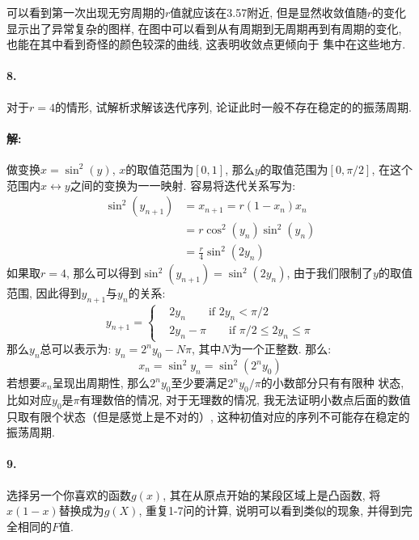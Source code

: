 \documentclass[a4paper,zihao=5,UTF8]{ctexart}
\begin{document}
    可以看到第一次出现无穷周期的$r$值就应该在3.57附近, 但是显然收敛值随$r$的变化显示出了异常复杂的图样, 
    在图中可以看到从有周期到无周期再到有周期的变化, 也能在其中看到奇怪的颜色较深的曲线, 这表明收敛点更倾向于
    集中在这些地方.

    \paragraph{8.}
    对于$r=4$的情形, 试解析求解该迭代序列, 论证此时一般不存在稳定的的振荡周期.
    \paragraph{解: }
    做变换$x = \sin^2(y)$, $x$的取值范围为$[0, 1]$, 那么$y$的取值范围为$[0, \pi/2]$, 在这个
    范围内$x\leftrightarrow y$之间的变换为一一映射. 容易将迭代关系写为:
    \begin{equation}
        \begin{split}
            \sin^2(y_{n+1}) &= x_{n+1} = r(1 - x_n)x_n\\
            & = r\cos^2(y_n)\sin^2(y_n)\\
            & = \frac{r}{4}\sin^2(2y_n)
        \end{split}
    \end{equation}
    如果取$r = 4$, 那么可以得到$\sin^2(y_{n+1}) = \sin^2(2y_n)$, 由于我们限制了$y$的取值范围, 
    因此得到$y_{n+1}$与$y_n$的关系:
    \begin{equation}
        y_{n+1} = 
        \left\{
        \begin{aligned}
            &2y_n\quad\quad \text{if}\,\, 2y_n < \pi/2\\
            &2y_n - \pi \quad\quad \text{if}\,\,\pi / 2 \leq 2y_n \leq \pi 
        \end{aligned}
        \right.
    \end{equation}
    那么$y_n$总可以表示为: $y_n = 2^n y_0 - N\pi$, 其中$N$为一个正整数. 
    那么:
    \begin{equation}
        x_n = \sin^2{y_n} = \sin^2(2^ny_0)
    \end{equation}
    若想要$x_n$呈现出周期性, 那么$2^ny_0$至少要满足$2^ny_0 / \pi$的小数部分只有有限种
    状态, 比如对应$y_0$是$\pi$有理数倍的情况, 对于无理数的情况, 我无法证明小数点后面的数值
    只取有限个状态（但是感觉上是不对的）, 这种初值对应的序列不可能存在稳定的振荡周期.

    \paragraph{9.}
    选择另一个你喜欢的函数$g(x)$, 其在从原点开始的某段区域上是凸函数, 将$x(1-x)$替换成为$g(X)$,
    重复1-7问的计算, 说明可以看到类似的现象, 并得到完全相同的$F$值. 
\end{document}
